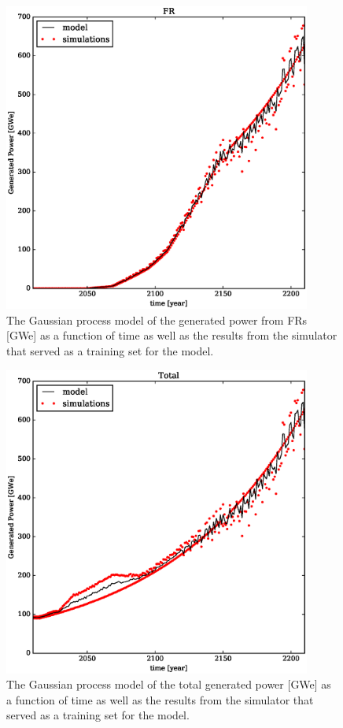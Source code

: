 \begin{figure}[htb]
\centering
\includegraphics[width=0.9\textwidth]{gwe-model-fr.eps}
\caption{The Gaussian process model of the generated power from FRs [GWe] 
as a function of time as well as the results from the simulator that served as a 
training set for the model.}
\label{gwe-model-fr}
\end{figure}

\begin{figure}[htb]
\centering
\includegraphics[width=0.9\textwidth]{gwe-model-total.eps}
\caption{The Gaussian process model of the total generated power [GWe] 
as a function of time as well as the results from the simulator that served as a 
training set for the model.}
\label{gwe-model-total}
\end{figure}

